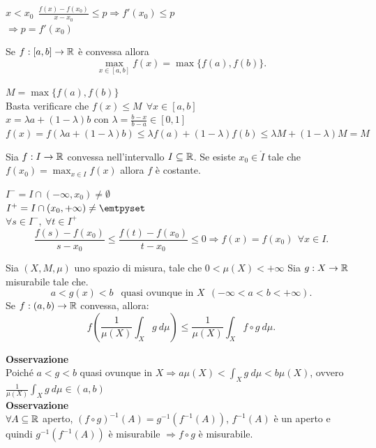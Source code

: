 \documentclass[12px]{article}
\begin{document}
  $x < x_0\ \ \frac{f(x) - f(x_0)}{x-x_0}\leq p \Rightarrow  f'(x_0)\leq p$ \\
  $ \Rightarrow p = f'(x_0)$ \\
  \begin{teo}
  Se $f:[a,b] \rightarrow \mathbb{R}$ è convessa allora
  \[
	  \max_{x\in[a,b]}f(x) = \max\{f(a),f(b)\}
  .\] 
  \end{teo}
  \begin{dimo}
	  $M = \max\{f(a),f(b)\}$\\
	  Basta verificare che $f(x)\leq M\ \ \forall x\in [a,b]$\\
	  $\displaystyle x = \lambda a + (1- \lambda) b$ con $ \lambda = \frac{b-x}{b-a}\in[0,1]$\\
	  $f(x) = f( \lambda a + (1 - \lambda)b)\leq \lambda f(a) + (1- \lambda)f(b)\leq \lambda M + (1- \lambda)M= M$
  \end{dimo}
  \begin{teo}
	  Sia $f:I \rightarrow \mathbb{R}$ convessa nell'intervallo $I\subseteq \mathbb{R}$. Se esiste $x_0\in \mathring I$ tale che $f(x_0) = \max_{x\in I} f(x)$ allora $f$ è costante.
  \end{teo}
  \begin{dimo}
  	$I^- = I\cap (-\infty,x_0)\neq \emptyset$\\
	$I^+= I\cap (x_0, +\infty)\neq \emtpyset$ \\
	$\forall s\in I^-, \ \forall t\in I^+$
	 \[
		 \frac{f(s)-f(x_0)}{s-x_0}\leq \frac{f(t)-f(x_0)}{t-x_0}\leq 0 \Rightarrow  f(x) = f(x_0)\ \ \forall x\in I
	.\] 
  \end{dimo}
  \begin{teo}
  	Sia $(X,M,\mu)$ uno spazio di misura, tale che  $0<\mu(X)< +\infty$ Sia  $g: X \rightarrow \mathbb{R}$ misurabile tale che.
	\[
		a < g(x) < b \ \ \text{ quasi ovunque in }X\ \ (-\infty<a<b<+\infty) 
	.\] 
	Se $f:(a,b) \rightarrow \mathbb{R}$ convessa, allora:\\
	\[
		f\left(\frac{1}{\mu(X)}\int_Xg\ d\mu\right)\leq \frac 1{\mu(X)}\int_Xf\circ g\ d\mu
	.\] 
  \end{teo}
  \textbf{Osservazione}\\
  Poiché $a< g< b$ quasi ovunque in  $X \Rightarrow  a\mu(X)<\int_Xg\ d\mu < b\mu(X)$, ovvero $\frac{1}{\mu(X)}\int_{X}g\ d\mu\in(a,b)$\\
   \textbf{Osservazione}\\
   $\forall A\subseteq \mathbb{R}$ aperto,  $(f\circ g)^{-1}(A) =g^{-1}(f^{-1}(A))$,  $f^{-1}(A)$ è un aperto e quindi  $g^{-1}(f^{-1}(A))$ è misurabile $ \Rightarrow  f\circ g$ è misurabile.
\end{document}
